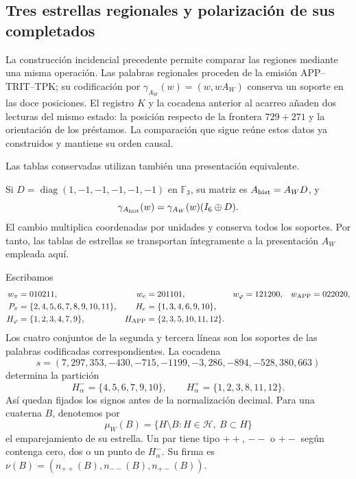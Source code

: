 \subsection{Tres estrellas regionales y polarización de sus completados}
\label{star27:comparacion}

La construcción incidencial precedente permite comparar las regiones
mediante una misma operación. Las palabras regionales proceden de la
emisión APP--TRIT--TPK; su codificación por
\(\gamma_{A_W}(w)=(w,wA_W)\) conserva un soporte en las doce posiciones.
El registro \(K\) y la cocadena anterior al acarreo añaden dos lecturas
del mismo estado: la posición respecto de la frontera \(729+271\) y la
orientación de los préstamos. La comparación que sigue reúne estos
datos ya construidos y mantiene su orden causal.

Las tablas conservadas utilizan también una presentación equivalente.
\par %
Si \(D=\operatorname{diag}(1,-1,-1,-1,-1,-1)\) en
\(\mathbb F_3\), su matriz es \(A_{\rm hist}=A_WD\), y
\[
\gamma_{A_{\rm hist}}(w)=\gamma_{A_W}(w)(I_6\oplus D).
\]
El cambio multiplica coordenadas por unidades y conserva todos los
soportes. Por tanto, las tablas de estrellas se transportan
íntegramente a la presentación \(A_W\) empleada aquí.

Escribamos
\[
\begin{aligned}
w_\pi&=010211,&w_e&=201101,&
w_\varphi&=121200,&w_{\rm APP}&=022020,\\
P_\pi&=\{2,4,5,6,7,8,9,10,11\},&
H_e&=\{1,3,4,6,9,10\},\\
H_\varphi&=\{1,2,3,4,7,9\},&
H_{\rm APP}&=\{2,3,5,10,11,12\}.
\end{aligned}
\]
Los cuatro conjuntos de la segunda y tercera líneas son los soportes
de las palabras codificadas correspondientes. La cocadena
\[
s=(7,297,353,-430,-715,-1199,-3,286,-894,-528,380,663)
\]
determina la partición
\[
H^-_\alpha=\{4,5,6,7,9,10\},\qquad
H^+_\alpha=\{1,2,3,8,11,12\}.
\]
Así quedan fijados los signos antes de la normalización decimal.
Para una cuaterna \(B\), denotemos por
\[
\mu_W(B)=\{H\setminus B:H\in\mathcal H,\ B\subset H\}
\]
el emparejamiento de su estrella. Un par tiene tipo \(++\), \(--\) o
\(+-\) según contenga cero, dos o un punto de \(H^-_\alpha\).
Su firma es
\(\nu(B)=(n_{++}(B),n_{--}(B),n_{+-}(B))\).


